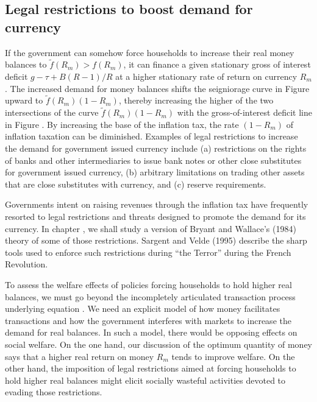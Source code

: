 \subsection{Legal restrictions to boost demand for currency}
If the government can somehow force households to increase their
real money balances to $\tilde f(R_m)>f(R_m)$, it can finance a
given stationary gross
of interest deficit $g - \tau + B(R-1)/R$ at a higher stationary
rate of return on currency $R_m$.  The increased demand for money
balances shifts the seigniorage curve in Figure  %
upward to
$\tilde f(R_m)(1-R_m)$, thereby increasing  the higher of the
two intersections of the curve $\tilde f(R_m)(1-R_m)$ with the
gross-of-interest deficit line in Figure . %
  By increasing the
base of the inflation tax, the rate $(1-R_m)$ of inflation
taxation can be diminished.
Examples of legal restrictions to increase the demand for government
issued currency include (a) restrictions on the rights of banks and
other intermediaries to issue bank notes or other close substitutes
for government issued currency,
(b) arbitrary limitations on trading other assets that are close substitutes with
currency, and (c) reserve requirements.


   Governments intent on raising revenues through the inflation
tax have frequently resorted to legal restrictions and threats
designed to promote the demand for its currency.  In chapter
, we shall study a version of Bryant and Wallace's
(1984) theory of some of those restrictions.  Sargent and Velde
(1995) describe  the sharp tools used to enforce such restrictions during ``the Terror'' during the French
Revolution.
%
%
%


To assess the welfare effects of policies forcing households to hold higher
real balances, we must go beyond the incompletely articulated
transaction process underlying equation .
We need an explicit model of how money facilitates transactions and
how the government interferes with markets to increase the demand for
real balances.  In such a model, there would be opposing effects on
social welfare. On the one hand, our discussion of the optimum quantity
of money says that a higher real return on money $R_m$ tends to improve
welfare. On the other hand, the imposition of legal restrictions aimed
at forcing households to hold higher real balances might elicit socially
wasteful activities devoted to evading those
restrictions.
%
%
%
